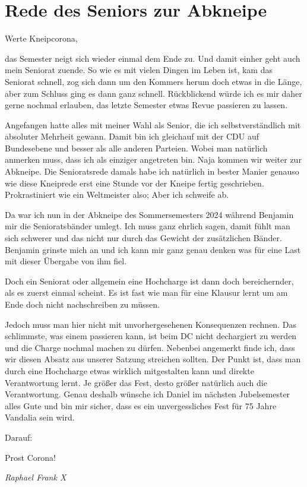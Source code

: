 \section{Rede des Seniors zur Abkneipe}

\begin{multicols}{2}


Werte Kneipcorona,



das Semester neigt sich
wieder einmal dem Ende zu. Und damit einher geht auch mein Seniorat zuende. So
wie es mit vielen Dingen im Leben ist, kam das Seniorat schnell, zog sich dann
um den Kommers herum doch etwas in die Länge, aber zum Schluss ging es dann
ganz schnell. Rückblickend würde ich es mir daher gerne nochmal erlauben, das
letzte Semester etwas Revue passieren zu lassen.



Angefangen hatte alles mit
meiner Wahl als Senior, die ich selbstverständlich mit absoluter Mehrheit
gewann. Damit bin ich gleichauf mit der CDU auf Bundesebene und besser als alle
anderen Parteien. Wobei man natürlich anmerken muss, dass ich als einziger
angetreten bin. Naja kommen wir weiter zur Abkneipe. Die Senioratsrede damals
habe ich natürlich in bester Manier genauso wie diese Kneiprede erst eine
Stunde vor der Kneipe fertig geschrieben. Prokrastiniert wie ein Weltmeister
also; Aber
ich schweife ab.



Da war ich nun in der
Abkneipe des Sommersemesters 2024 während Benjamin mir die Senioratsbänder
umlegt. Ich muss ganz ehrlich sagen, damit fühlt man sich schwerer und das
nicht nur durch das Gewicht der zusätzlichen Bänder. Benjamin grinste mich an
und ich kann mir ganz genau denken was für eine Last mit dieser Übergabe von
ihm fiel.



Doch ein Seniorat oder
allgemein eine Hochcharge ist dann doch bereichernder, als es zuerst einmal
scheint. Es ist fast wie man für eine Klausur lernt um am Ende doch nicht
nachschreiben zu müssen.



Jedoch muss man hier nicht
mit unvorhergesehenen Konsequenzen rechnen. Das schlimmste, was einem passieren
kann, ist beim DC nicht dechargiert zu werden und die Charge nochmal machen zu
dürfen. Nebenbei angemerkt finde ich, dass wir diesen Absatz aus unserer
Satzung streichen sollten. Der Punkt ist, dass man durch eine Hochcharge etwas
wirklich mitgestalten kann und direkte Verantwortung lernt. Je größer das Fest,
desto größer natürlich auch die Verantwortung. Genau deshalb wünsche ich Daniel
im nächsten Jubelsemester alles Gute und bin mir sicher, dass es ein
unvergessliches Fest für 75 Jahre Vandalia sein wird.



Darauf:



Prost Corona!





	\begin{flushright}
		\hfill\emph{Raphael Frank X}
	\end{flushright}
\end{multicols}